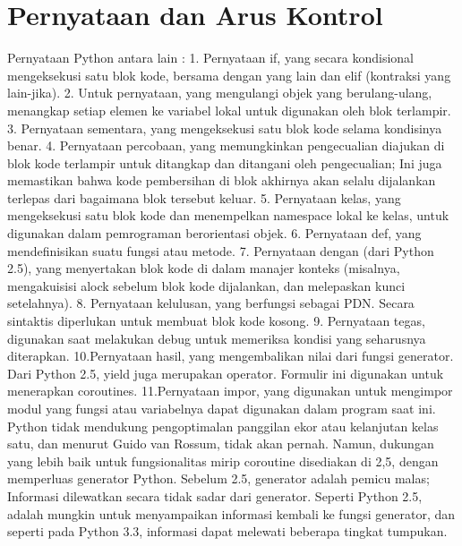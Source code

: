 	\section {Pernyataan dan Arus Kontrol}
	Pernyataan Python antara lain :
	1. Pernyataan if, yang secara kondisional mengeksekusi satu blok kode, bersama dengan yang lain dan elif (kontraksi yang lain-jika).
	2. Untuk pernyataan, yang mengulangi objek yang berulang-ulang, menangkap setiap elemen ke variabel lokal untuk digunakan oleh blok terlampir.
	3. Pernyataan sementara, yang mengeksekusi satu blok kode selama kondisinya benar.
	4. Pernyataan percobaan, yang memungkinkan pengecualian diajukan di blok kode terlampir untuk ditangkap dan ditangani oleh pengecualian; Ini juga memastikan bahwa kode pembersihan di blok akhirnya akan selalu dijalankan terlepas dari bagaimana blok tersebut keluar.
	5. Pernyataan kelas, yang mengeksekusi satu blok kode dan menempelkan namespace lokal ke kelas, untuk digunakan dalam pemrograman berorientasi objek.
	6. Pernyataan def, yang mendefinisikan suatu fungsi atau metode.
	7. Pernyataan dengan (dari Python 2.5), yang menyertakan blok kode di dalam manajer konteks (misalnya, mengakuisisi alock sebelum blok kode dijalankan, dan melepaskan kunci setelahnya).
	8. Pernyataan kelulusan, yang berfungsi sebagai PDN. Secara sintaktis diperlukan untuk membuat blok kode kosong.
	9. Pernyataan tegas, digunakan saat melakukan debug untuk memeriksa kondisi yang seharusnya diterapkan.
	10.Pernyataan hasil, yang mengembalikan nilai dari fungsi generator. Dari Python 2.5, yield juga merupakan operator. Formulir ini digunakan untuk menerapkan coroutines.
	11.Pernyataan impor, yang digunakan untuk mengimpor modul yang fungsi atau variabelnya dapat digunakan dalam program saat ini.
	Python tidak mendukung pengoptimalan panggilan ekor atau kelanjutan kelas satu, dan menurut Guido van Rossum, tidak akan pernah. 
	Namun, dukungan yang lebih baik untuk fungsionalitas mirip coroutine disediakan di 2,5, dengan memperluas generator Python. 
	Sebelum 2.5, generator adalah pemicu malas; Informasi dilewatkan secara tidak sadar dari generator. Seperti Python 2.5, adalah mungkin 
	untuk menyampaikan informasi kembali ke fungsi generator, dan seperti pada Python 3.3, informasi dapat melewati beberapa tingkat tumpukan.

